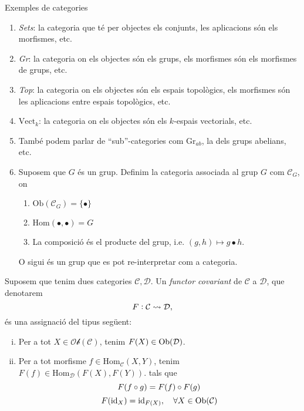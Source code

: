 \documentclass[../main.tex]{subfiles}
\begin{document}
\begin{ej}Exemples de categories
\begin{enumerate}
    \item \textit{Sets}: la categoria que té per objectes els conjunts, les aplicacions són els morfismes, etc.
    \item \textit{Gr}: la categoria on els objectes són els grups, els morfismes són els morfismes de grups, etc.
    \item \textit{Top}: la categoria on els objectes són els espais topològics, els morfismes són les aplicacions entre espais topològics, etc.
    \item \textit{$\mathrm{Vect}_k$}: la categoria on els objectes són els $k$-espais vectorials, etc.
    \item També podem parlar de ``sub''-categories com $\mathrm{Gr}_{ab}$, la dels grups abelians, etc.
    \item Suposem que $G$ és un grup. Definim la categoria associada al grup $G$ com $\mathcal{C}_G$, on
    \begin{enumerate}
        \item $\mathrm{Ob}(\mathcal{C}_G) = \{\bullet\}$
        \item $\mathrm{Hom}(\bullet,\bullet)=G$
        \item La composició és el producte del grup, i.e. $(g,h)\mapsto g\bullet h$.
    \end{enumerate}
    O sigui és un grup que es pot re-interpretar com a categoria.
\end{enumerate}
\end{ej}


\begin{defi}
[Functor] Suposem que tenim dues categories $\mathcal{C}, \mathcal{D}$. Un \textit{functor covariant} de $\mathcal{C}$ a $\mathcal{D}$, que denotarem
\begin{equation}
    \notag
    F:\mathcal{C}\leadsto\mathcal{D},
\end{equation}
és una assignació del tipus següent:
\begin{enumerate}[(i)]
    \item Per a tot $X\in\mathcal{Ob}(\mathcal{C})$, tenim $F(X)\in\mathrm{Ob}(\mathcal{D})$.
    \item Per a tot morfisme $f\in\mathrm{Hom}_{\mathcal{C}}(X,Y)$, tenim $F(f)\in\mathrm{Hom}_{\mathcal{D}}(F(X),F(Y))$.
    tals que
    \begin{equation}
        \notag
        F(f\circ g)=F(f)\circ F(g)
    \end{equation}
    \begin{equation}
        \notag
        F(\mathrm{id}_X)=\mathrm{id}_{F(X)},\quad \forall X\in\mathrm{Ob}(\mathcal{C})
    \end{equation}
\end{enumerate}
\end{defi}
\end{document}
